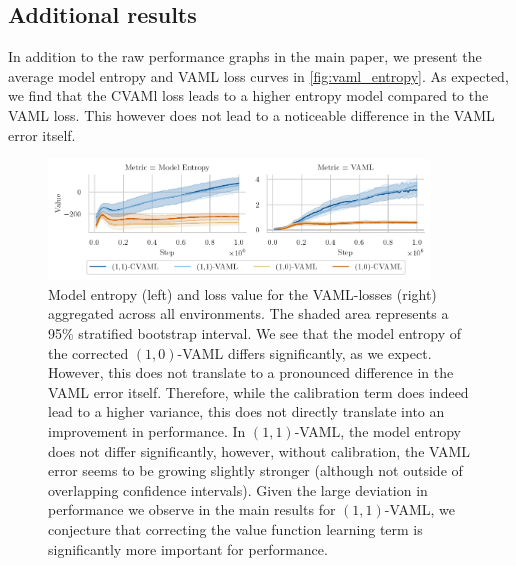 \subsection{Additional results}

In addition to the raw performance graphs in the main paper, we present the average model entropy and VAML loss curves in \autoref{fig:vaml_entropy}.
As expected, we find that the CVAMl loss leads to a higher entropy model compared to the VAML loss.
This however does not lead to a noticeable difference in the VAML error itself.

\begin{figure}[h]
    \centering
    \includegraphics[width=0.9\textwidth]{figures/lambda/plts/app_metrics.pdf} 
    \caption{Model entropy (left) and loss value for the VAML-losses (right) aggregated across all environments. The shaded area represents a 95\% stratified bootstrap interval. We see that the model entropy of the corrected $(1,0)$-VAML differs significantly, as we expect. However, this does not translate to a pronounced difference in the VAML error itself. Therefore, while the calibration term does indeed lead to a higher variance, this does not directly translate into an improvement in performance. In $(1,1)$-VAML, the model entropy does not differ significantly, however, without calibration, the VAML error seems to be growing slightly stronger (although not outside of overlapping confidence intervals). Given the large deviation in performance we observe in the main results for $(1,1)$-VAML, we conjecture that correcting the value function learning term is significantly more important for performance.}
   \label{fig:vaml_entropy}
\end{figure}